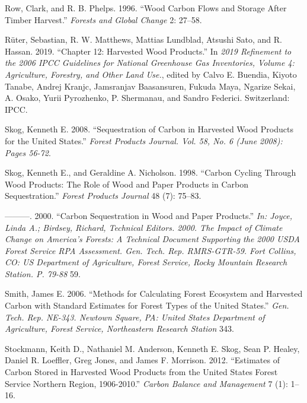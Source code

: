 \documentclass[
  openany]{book}
\newlength{\cslhangindent}
\newlength{\cslentryspacingunit} %
\newenvironment{CSLReferences}[2] %
 {%
  \setlength{\parindent}{0pt}
  \ifodd #1
  \let\oldpar\par
  \def\par{\hangindent=\cslhangindent\oldpar}
  \fi
  \setlength{\parskip}{#2\cslentryspacingunit}
 }%
 {}
\begin{document}
\begin{CSLReferences}{1}{0}
\leavevmode{}%
Row, Clark, and R. B. Phelps. 1996. {``Wood Carbon Flows and Storage
After Timber Harvest.''} \emph{Forests and Global Change} 2: 27--58.

\leavevmode{}%
Rüter, Sebastian, R. W. Matthews, Mattias Lundblad, Atsushi Sato, and R.
Hassan. 2019. {``Chapter 12: Harvested Wood Products.''} In \emph{2019
Refinement to the 2006 IPCC Guidelines for National Greenhouse Gas
Inventories, Volume 4: Agriculture, Forestry, and Other Land Use.},
edited by Calvo E. Buendia, Kiyoto Tanabe, Andrej Kranjc, Jamsranjav
Baasansuren, Fukuda Maya, Ngarize Sekai, A. Osako, Yurii Pyrozhenko, P.
Shermanau, and Sandro Federici. Switzerland: IPCC.

\leavevmode{}%
Skog, Kenneth E. 2008. {``Sequestration of Carbon in Harvested Wood
Products for the United States.''} \emph{Forest Products Journal. Vol.
58, No. 6 (June 2008): Pages 56-72}.

\leavevmode{}%
Skog, Kenneth E., and Geraldine A. Nicholson. 1998. {``Carbon Cycling
Through Wood Products: The Role of Wood and Paper Products in Carbon
Sequestration.''} \emph{Forest Products Journal} 48 (7): 75--83.

\leavevmode{}%
---------. 2000. {``Carbon Sequestration in Wood and Paper Products.''}
\emph{In: Joyce, Linda A.; Birdsey, Richard, Technical Editors. 2000.
The Impact of Climate Change on America's Forests: A Technical Document
Supporting the 2000 USDA Forest Service RPA Assessment. Gen. Tech. Rep.
RMRS-GTR-59. Fort Collins, CO: US Department of Agriculture, Forest
Service, Rocky Mountain Research Station. P. 79-88} 59.

\leavevmode{}%
Smith, James E. 2006. {``Methods for Calculating Forest Ecosystem and
Harvested Carbon with Standard Estimates for Forest Types of the United
States.''} \emph{Gen. Tech. Rep. NE-343. Newtown Square, PA: United
States Department of Agriculture, Forest Service, Northeastern Research
Station} 343.

\leavevmode{}%
Stockmann, Keith D., Nathaniel M. Anderson, Kenneth E. Skog, Sean P.
Healey, Daniel R. Loeffler, Greg Jones, and James F. Morrison. 2012.
{``Estimates of Carbon Stored in Harvested Wood Products from the United
States Forest Service Northern Region, 1906-2010.''} \emph{Carbon
Balance and Management} 7 (1): 1--16.


\end{CSLReferences}
\end{document}
